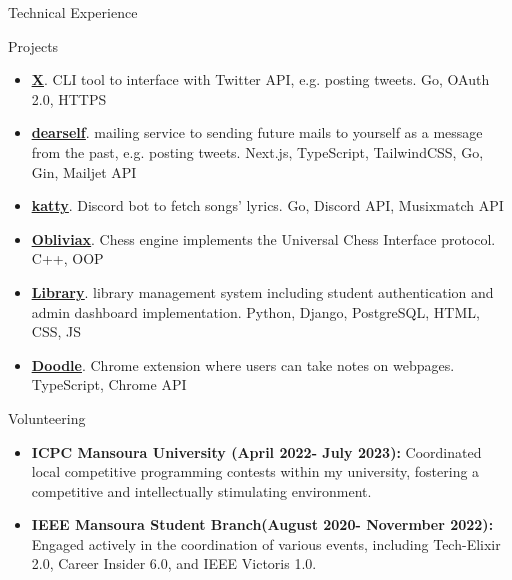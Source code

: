 \documentclass[]{cv}
\begin{document}
	\begin{cvsection}{Technical Experience}
	\vspace{2mm}

		\begin{cvsubsection}{Projects}{}{}
			\begin{itemize}
				\item \textbf{{\color{blue}\underline{\href{https://github.com/devhindo/x}{X}}}}. CLI tool to interface with Twitter API, e.g. posting tweets.  Go, OAuth 2.0, HTTPS
				
				\item \textbf{{\color{blue}\underline{\href{https://github.com/devhindo/dearself}{dearself}}}}. mailing service to sending future mails to yourself as a message from the past, e.g. posting tweets.  Next.js, TypeScript, TailwindCSS, Go, Gin, Mailjet API

				\item \textbf{{\color{blue}\underline{\href{https://github.com/devhindo/katty}{katty}}}}. Discord bot to fetch songs' lyrics.  Go, Discord API, Musixmatch API				
				
				\item \textbf{{\color{blue}\underline{\href{https://github.com/devhindo/obliviax}{Obliviax}}}}. Chess engine implements the Universal Chess Interface protocol.  C++, OOP
				
				
				
				\item \textbf{{\color{blue}\underline{\href{https://github.com/lilhind/iti23/tree/main/library}{Library}}}}. library management system including student authentication and admin dashboard implementation.  Python, Django, PostgreSQL, HTML, CSS, JS

				\item \textbf{{\color{blue}\underline{\href{https://github.com/devhindo/doodle}{Doodle}}}}. Chrome extension where users can take notes on webpages. TypeScript, Chrome API				
				

			\end{itemize}
		\end{cvsubsection}
	\end{cvsection}
	
	\begin{cvsection}{Volunteering}
				\vspace{2mm}

		\begin{cvsubsection}{}{}{}	
			\begin{itemize}
				\item \textbf{ICPC Mansoura University (April 2022- July 2023):} Coordinated local competitive programming contests within my university, fostering a competitive and intellectually stimulating environment.
				\item \textbf{IEEE Mansoura Student Branch(August 2020- Novermber 2022):} Engaged actively in the coordination of various events, including Tech-Elixir 2.0, Career Insider 6.0, and IEEE Victoris 1.0. 
			\end{itemize}
		\end{cvsubsection}
	\end{cvsection}
\end{document}
